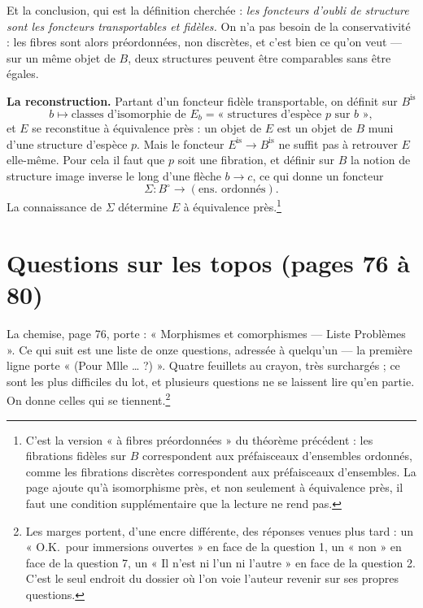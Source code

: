 \documentclass[11pt,a4paper]{article}
\begin{document}
Et la conclusion, qui est la définition cherchée : \emph{les foncteurs d'oubli
de structure sont les foncteurs transportables et fidèles.} On n'a pas besoin
de la conservativité : les fibres sont alors préordonnées, non discrètes, et
c'est bien ce qu'on veut — sur un même objet de $B$, deux structures peuvent
être comparables sans être égales.


\textbf{La reconstruction.} Partant d'un foncteur fidèle transportable, on
définit sur $B^{\mathrm{is}}$
\[
  b \longmapsto \text{classes d'isomorphie de } E_{b}
  = \text{« structures d'espèce } p \text{ sur } b \text{ »} ,
\]
et $E$ se reconstitue à équivalence près : un objet de $E$ est un objet de $B$
muni d'une structure d'espèce $p$. Mais le foncteur
$E^{\mathrm{is}} \to B^{\mathrm{is}}$ ne suffit pas à retrouver $E$ elle-même.
Pour cela il faut que $p$ soit une fibration, et définir sur $B$ la notion de
structure image inverse le long d'une flèche $b \to c$, ce qui donne un
foncteur
\[
  \Sigma : B^{\circ} \longrightarrow (\text{ens.\ ordonnés}) .
\]
La connaissance de $\Sigma$ détermine $E$ à équivalence près.\footnote{C'est la
version « à fibres préordonnées » du théorème précédent : les fibrations
fidèles sur $B$ correspondent aux préfaisceaux d'ensembles ordonnés, comme les
fibrations discrètes correspondent aux préfaisceaux d'ensembles. La page ajoute
qu'à isomorphisme près, et non seulement à équivalence près, il faut une
condition supplémentaire que la lecture ne rend pas.}

\section*{Questions sur les topos (pages 76 à 80)}

La chemise, page 76, porte : « Morphismes et comorphismes — Liste Problèmes ».
Ce qui suit est une liste de onze questions, adressée à quelqu'un — la première
ligne porte « (Pour Mlle … ?) ». Quatre feuillets au
crayon, très surchargés ; ce sont les plus difficiles du lot, et plusieurs
questions ne se laissent lire qu'en partie. On donne celles qui se
tiennent.\footnote{Les marges portent, d'une encre différente, des réponses
venues plus tard : un « O.K.\ pour immersions ouvertes » en face de la question
1, un « non » en face de la question 7, un « Il n'est ni l'un ni l'autre » en
face de la question 2. C'est le seul endroit du dossier où l'on voie l'auteur
revenir sur ses propres questions.}
\end{document}
